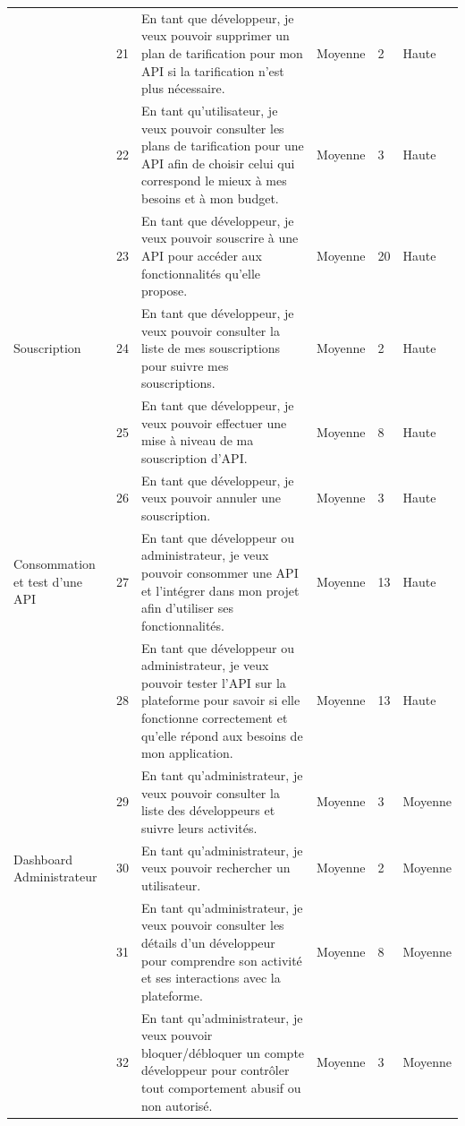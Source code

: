 \begin{landscape}
\begin{longtable}[c]{
    |p{}
    |p{}
    |p{}
    |p{}
    |p{}
    |p{}|
    }
 & 21 & En tant que développeur, je veux pouvoir supprimer un plan de tarification pour mon API si la tarification n'est plus nécessaire. & Moyenne & 2 & Haute \\
\cline{2-2} \cline{3-6}

 & 22 & En tant qu'utilisateur, je veux pouvoir consulter les plans de tarification pour une API afin de choisir celui qui correspond le mieux à mes besoins et à mon budget. & Moyenne & 3 & Haute \\
\hline
 & 23 & En tant que développeur, je veux pouvoir souscrire à une API pour accéder aux fonctionnalités qu'elle propose. & Moyenne & 20 & Haute \\
\cline{2-2} \cline{3-6}
Souscription & 24 & En tant que développeur, je veux pouvoir consulter la liste de mes souscriptions pour suivre mes souscriptions. & Moyenne & 2 & Haute \\
\cline{2-2} \cline{3-6}
 & 25 & En tant que développeur, je veux pouvoir effectuer une mise à niveau de ma souscription d'API. & Moyenne & 8 & Haute \\
\cline{2-2} \cline{3-6}
 & 26 & En tant que développeur, je veux pouvoir annuler une souscription. & Moyenne & 3 & Haute \\
\hline

Consommation et test d'une API & 27 & En tant que développeur ou administrateur, je veux pouvoir consommer une API et l'intégrer dans mon projet afin d'utiliser ses fonctionnalités. & Moyenne & 13 & Haute \\
\cline{2-2} \cline{3-6}

 & 28 & En tant que développeur ou administrateur, je veux pouvoir tester l'API sur la plateforme pour savoir si elle fonctionne correctement et qu'elle répond aux besoins de mon application. & Moyenne & 13 & Haute \\
\hline
 & 29 & En tant qu'administrateur, je veux pouvoir consulter la liste des développeurs et suivre leurs activités. & Moyenne & 3 & Moyenne \\
\cline{2-2} \cline{3-6}
Dashboard Administrateur & 30 & En tant qu'administrateur, je veux pouvoir rechercher un utilisateur. & Moyenne & 2 & Moyenne \\
\cline{2-2} \cline{3-6}
 & 31 & En tant qu'administrateur, je veux pouvoir consulter les détails d'un développeur pour comprendre son activité et ses interactions avec la plateforme. & Moyenne & 8 & Moyenne \\
\cline{2-2} \cline{3-6}
 & 32 & En tant qu'administrateur, je veux pouvoir bloquer/débloquer un compte développeur pour contrôler tout comportement abusif ou non autorisé. & Moyenne & 3 & Moyenne \\
\hline


\end{longtable}
\end{landscape}
